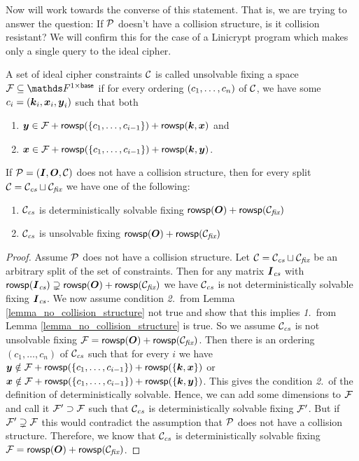 Now will work towards the converse of this statement.
That is, we are trying to answer the question:
If $\P$ doesn't have a collision structure,
is it collision resistant?
We will confirm this for the case of a Linicrypt program which makes only a single query to the ideal cipher.

\begin{defn}
    A set of ideal cipher constraints $\C$ is called unsolvable fixing a space $\Fix \subseteq \Frowsp$ if for every ordering $(\dts c n)$ of $\C$,
    we have some $c_i = (\vk_i, \vx_i, \vy_i)$ such that both
    \begin{enumerate}
    \item    $\vy \in \Fix + \rowsp(\{\dts c {i-1}\}) + \rowsp(\vk, \vx)$ and
    \item    $\vx \in \Fix + \rowsp(\{\dts c {i-1}\}) + \rowsp(\vk, \vy)$.
    \end{enumerate}
\end{defn}

\begin{lemma}
\label{lemma_no_collision_structure}
    If $\P = (\I,\O,\C)$ does not have a collision structure,
    then for every split $\C = \Ccs \sqcup \Cfix$ we have one of the following:
    \begin{enumerate}
    \item $\Ccs$ is deterministically solvable fixing $\rowsp(\O) + \rowsp(\Cfix)$
    \item $\Ccs$ is unsolvable fixing $\rowsp(\O) + \rowsp(\Cfix)$
    \end{enumerate}
\end{lemma}

\begin{proof}
    Assume $\P$ does not have a collision structure.
    Let $\C = \Ccs \sqcup \Cfix$ be an arbitrary split of the set of constraints.
    Then for any matrix $\Ics$ with $\rowsp(\Ics) \supsetneq \rowsp(\O) + \rowsp(\Cfix)$ we have
    $\Ccs$ is not deterministically solvable fixing $\Ics$.
    We now assume condition \textit{2.}~from Lemma \ref{lemma_no_collision_structure} not true
    and show that this implies \textit{1.}~from Lemma \ref{lemma_no_collision_structure} is true.
    So we assume $\Ccs$ is not unsolvable fixing $\Fix = \rowsp(\O) + \rowsp(\Cfix)$.
    Then there is an ordering $(c_1, \dots, c_n)$ of $\Ccs$ such that for every $i$ we have
    $\vy \notin \Fix + \rowsp(\{\dts c {i-1}\}) + \rowsp(\{ \vk, \vx \})$ or
    $\vx \notin \Fix + \rowsp(\{\dts c {i-1}\}) + \rowsp(\{ \vk, \vy \})$.
    This gives the condition \textit{2.}~of the definition of deterministically solvable.
    Hence, we can add some dimensions to $\Fix$ and call it $\Fix' \supset \Fix$ such that
    $\Ccs$ is deterministically solvable fixing $\Fix'$.
    But if $\Fix' \supsetneq \Fix$ this would contradict the assumption that $\P$ does not have a collision structure.
    Therefore, we know that $\Ccs$ is deterministically solvable fixing $\Fix = \rowsp(\O) + \rowsp(\Cfix)$.
\end{proof}

